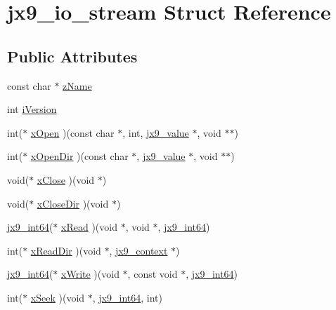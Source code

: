 \hypertarget{structjx9__io__stream}{\section{jx9\-\_\-io\-\_\-stream Struct Reference}
\label{d0/d90/structjx9__io__stream}
}
\subsection*{Public Attributes}
\begin{DoxyCompactItemize}
\item 
const char $\ast$ \hyperlink{structjx9__io__stream_ab2a6828551a33585ef5e2d49cff917f6}{z\-Name}
\item 
int \hyperlink{structjx9__io__stream_a9c726e7797568d479de1044c0bafbed5}{i\-Version}
\item 
int($\ast$ \hyperlink{structjx9__io__stream_a89e195ec0aacccff02027e00314b76b2}{x\-Open} )(const char $\ast$, int, \hyperlink{structjx9__value}{jx9\-\_\-value} $\ast$, void $\ast$$\ast$)
\item 
int($\ast$ \hyperlink{structjx9__io__stream_a205f713f920e2b646061c55de3d82157}{x\-Open\-Dir} )(const char $\ast$, \hyperlink{structjx9__value}{jx9\-\_\-value} $\ast$, void $\ast$$\ast$)
\item 
void($\ast$ \hyperlink{structjx9__io__stream_a5a5fdda998b03d7e8ffac07d0f6ef6cf}{x\-Close} )(void $\ast$)
\item 
void($\ast$ \hyperlink{structjx9__io__stream_af8abb5f784be5285a9f6d75a24f9ff7e}{x\-Close\-Dir} )(void $\ast$)
\item 
\hyperlink{unqlite_8c_aeaac5ecf324354b1c4bb9f6559bab7af}{jx9\-\_\-int64}($\ast$ \hyperlink{structjx9__io__stream_aa463a8e1c68bf9a5e2b58d0ad6b40ad9}{x\-Read} )(void $\ast$, void $\ast$, \hyperlink{unqlite_8c_aeaac5ecf324354b1c4bb9f6559bab7af}{jx9\-\_\-int64})
\item 
int($\ast$ \hyperlink{structjx9__io__stream_a86708982144de161440bc422a3d477ef}{x\-Read\-Dir} )(void $\ast$, \hyperlink{structjx9__context}{jx9\-\_\-context} $\ast$)
\item 
\hyperlink{unqlite_8c_aeaac5ecf324354b1c4bb9f6559bab7af}{jx9\-\_\-int64}($\ast$ \hyperlink{structjx9__io__stream_a97a9de1f1f259a9fba9805d17744b6df}{x\-Write} )(void $\ast$, const void $\ast$, \hyperlink{unqlite_8c_aeaac5ecf324354b1c4bb9f6559bab7af}{jx9\-\_\-int64})
\item 
int($\ast$ \hyperlink{structjx9__io__stream_a1465a4adf477d491ebcb8d37d370a4ec}{x\-Seek} )(void $\ast$, \hyperlink{unqlite_8c_aeaac5ecf324354b1c4bb9f6559bab7af}{jx9\-\_\-int64}, int)

\end{DoxyCompactItemize}
